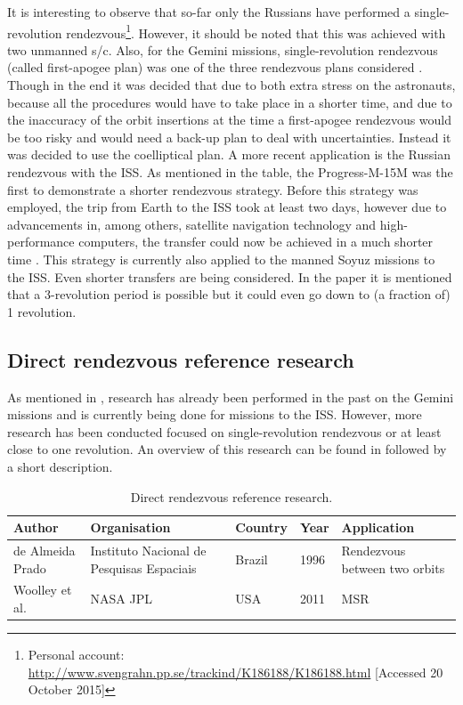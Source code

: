 It is interesting to observe that so-far only the Russians have performed a single-revolution rendezvous\footnote{Personal account: 
\url{http://www.svengrahn.pp.se/trackind/K186188/K186188.html} [Accessed 20 October 2015]}. However, it should be noted that this was achieved with two unmanned \ac{s/c}. Also, for the Gemini missions, single-revolution rendezvous (called first-apogee plan) was one of the three rendezvous plans considered \cite{mayer1968development}. Though in the end it was decided that due to both extra stress on the astronauts, because all the procedures would have to take place in a shorter time, and due to the inaccuracy of the orbit insertions at the time a first-apogee rendezvous would be too risky and would need a back-up plan to deal with uncertainties. Instead it was decided to use the coelliptical plan. A more recent application is the Russian rendezvous with the \ac{ISS}. As mentioned in the table, the Progress-M-15M was the first to demonstrate a shorter rendezvous strategy. Before this strategy was employed, the trip from Earth to the \ac{ISS} took at least two days, however due to advancements in, among others, satellite navigation technology and high-performance computers, the transfer could now be achieved in a much shorter time \cite{murtazin2014usage}. This strategy is currently also applied to the manned Soyuz missions to the \ac{ISS}. Even shorter transfers are being considered. In the paper it is mentioned that a 3-revolution period is possible but it could even go down to (a fraction of) 1 revolution.


\subsection{Direct rendezvous reference research}
\label{subsec:dirrenrefres}
As mentioned in , research has already been performed in the past on the Gemini missions and is currently being done for missions to the \ac{ISS}. However, more research has been conducted focused on single-revolution rendezvous or at least close to one revolution. An overview of this research can be found in  followed by a short description.


\begin{table}[!ht]
\begin{center}
\caption{Direct rendezvous reference research.}
\label{tab:directren_refres}
\begin{tabular}{|p{3cm}|p{3cm}|l|l|p{3cm}|}
\hline 
\textbf{Author} 	& \textbf{Organisation} & \textbf{Country} & \textbf{Year} & \textbf{Application} \\ \hline \hline
de Almeida Prado \cite{almeidaprado1996optimal} & Instituto Nacional de Pesquisas Espaciais & Brazil & 1996 & Rendezvous between two orbits \\ \hline
Woolley et al. \cite{woolley2011mars}& NASA \ac{JPL} & USA & 2011 & \ac{MSR} \\ \hline

\end{tabular}
\end{center}
\end{table}




